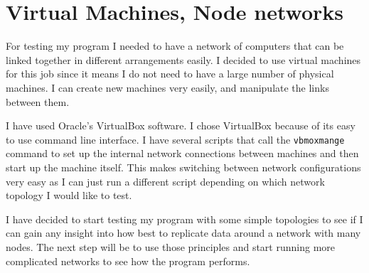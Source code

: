\documentclass[12pt]{article}
\begin{document}

\section{Virtual Machines, Node networks}
For testing my program I needed to have a network
of computers that can be linked together in different
arrangements easily. I decided to use virtual machines for
this job since it means I do not need to have a large number
of physical machines.  I can create new machines very easily, and manipulate the
links between them.

I have used Oracle's VirtualBox software. I chose
VirtualBox because of its easy to use command
line interface. I have several scripts that
call the \texttt{vbmoxmange} command to set up the internal
network connections between machines and then start up
the machine itself. This makes switching between
network configurations very easy as I can just
run a different script depending on which network
topology I would like to test.

I have decided to start testing my program with
some simple topologies to see if I can gain any
insight into how best to replicate data around
a network with many nodes. The next step will
be to use those principles and start running
more complicated networks to see how the program
performs.
\end{document}
